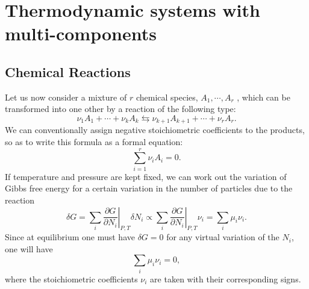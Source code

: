 \section{Thermodynamic systems with multi-components}
\subsection{Chemical Reactions}
Let us now consider a mixture of $r$ chemical species, $A_1,\cdots,A_r$ , which can be transformed into one other by a reaction of the following type:
\[\nu_1A_1+\cdots+\nu_kA_k　\leftrightarrows　\nu_{k+1}A_{k+1}+\cdots+\nu_rA_r.\]
We can conventionally assign negative stoichiometric coefficients to the products, so as to write this formula as a formal equation:
\[\sum_{i=1}^r \nu_iA_i = 0.\]
If temperature and pressure are kept fixed, we can work out the variation of Gibbs free energy for a certain variation in the number of particles due to the reaction
\[\delta G = \sum_i \left. \frac{\partial G}{\partial N_i} \right|_{P,T} \delta N_i \propto \sum_i \left. \frac{\partial G}{\partial N_i} \right|_{P,T} \nu_i = \sum_{i} \mu_i\nu_i.\]
Since at equilibrium one must have $\delta G = 0$ for any virtual variation of the $N_i$, one will have
\[\sum_{i} \mu_i\nu_i = 0,\]
where the stoichiometric coefficients $\nu_i$ are taken with their corresponding signs.

